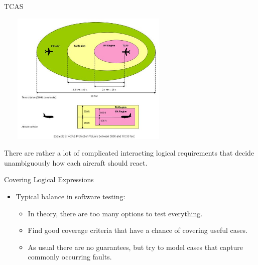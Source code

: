 \documentclass{beamer}
\begin{document}
\begin{frame}{TCAS}


  \begin{center}
        \includegraphics[height=2.5in,width=3.5in]{TCAS_Volume.jpg}
  \end{center}
There are rather a lot of complicated interacting logical requirements
that decide unambiguously how each aircraft should react.     
\end{frame}

\begin{frame}{Covering Logical Expressions}
  \begin{itemize}
  \item Typical balance in software testing:
    \begin{itemize}
    \item In theory, there are too many options to test everything.
    \item Find good coverage criteria that have a chance of covering
      useful cases.
    \item As usual there are no guarantees, but try to model cases that
      capture commonly occurring faults.
    \end{itemize}
  \end{itemize}  
\end{frame}
\end{document}
